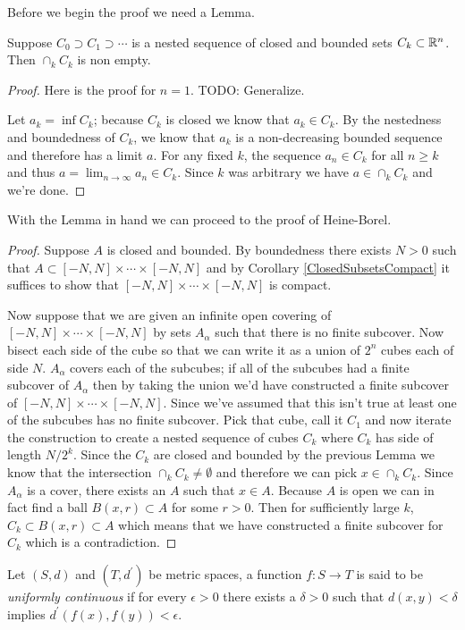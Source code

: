 Before we begin the proof we need a Lemma.
\begin{lem}\label{IntersectionCompactSets}Suppose $C_0 \supset C_1 \supset \cdots$ is a nested
  sequence of closed and bounded sets $C_k \subset \mathbb{R}^n$.  Then
  $\cap_k C_k$ is non empty.
\end{lem}
\begin{proof}Here is the proof for $n=1$.  TODO: Generalize.

Let $a_k = \inf C_k$; because $C_k$ is closed we know that $a_k \in
C_k$.  By the nestedness and boundedness of $C_k$, we know that $a_k$
is a non-decreasing bounded sequence and therefore has a limit $a$.
For any fixed $k$, the sequence $a_n \in C_k$ for all $n \geq k$ and
thus $a=\lim_{n \to \infty} a_n \in C_k$.  Since $k$ was arbitrary we
have $a \in \cap_k C_k$ and we're done.
\end{proof}
With the Lemma in hand we can proceed to the proof of Heine-Borel.
\begin{proof}
Suppose $A$ is closed and bounded.  By boundedness there exists $N>0$
such that $A \subset [-N,N] \times \cdots \times [-N,N]$ and by
Corollary \ref{ClosedSubsetsCompact} it suffices to show that $ [-N,N]
\times \cdots \times [-N,N]$ is compact.

Now suppose that we are given an infinite open covering of $ [-N,N]
\times \cdots \times [-N,N]$ by sets $A_\alpha$ such that there is no
finite subcover.  Now bisect each side of the cube so that we can
write it as a union of $2^n$ cubes each of side $N$.  $A_\alpha$
covers each of the subcubes; if all of the subcubes had a finite
subcover of $A_\alpha$ then by taking the union we'd have constructed
a finite subcover of $ [-N,N]
\times \cdots \times [-N,N]$.  Since we've assumed that this isn't
true at least one of the subcubes has no finite subcover.   Pick that
cube, call it $C_1$ and now iterate the construction to create a
nested sequence of cubes $C_k$ where $C_k$ has side of length
$N/2^k$.  Since the $C_k$ are closed and bounded by the previous Lemma
we know that the intersection $\cap_k C_k \neq \emptyset$ and
therefore we can pick $x \in \cap_k C_k$.  Since $A_\alpha$ is a
cover, there exists an $A$ such that $x \in A$.  Because $A$ is open
we can in fact find a ball $B(x,r) \subset A$ for some $r > 0$.  Then
for sufficiently large $k$, $C_k \subset B(x,r) \subset A$ which means
that we have constructed a finite subcover for $C_k$ which is a contradiction.
\end{proof}

\begin{defn}Let $(S,d)$ and $(T, d^\prime)$ be metric spaces, a
  function $f : S \to T$ is said to be \emph{uniformly continuous} if
  for every $\epsilon > 0$ there exists a $\delta > 0$ such that
  $d(x,y) < \delta$ implies $d^\prime(f(x), f(y)) < \epsilon$.
\end{defn}

